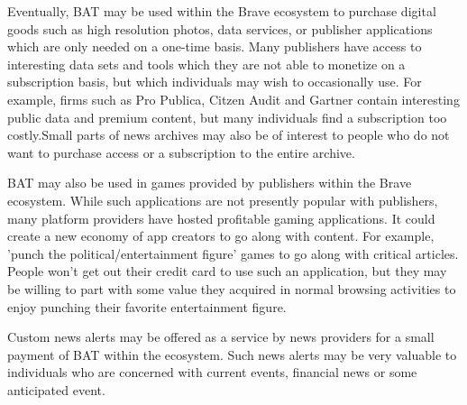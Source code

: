 \documentclass[11pt]{article}
\begin{document}
Eventually, BAT may be used within the Brave ecosystem to purchase digital goods such as high resolution photos, data services, or publisher applications which are only needed on a one-time basis. Many publishers have access to interesting data sets and tools which they are not able to monetize on a subscription basis, but which individuals may wish to occasionally use. For example, firms such as Pro Publica, Citzen Audit and Gartner contain interesting public data and premium content, but many individuals find a subscription too costly.Small parts of news archives may also be of interest to people who do not want to purchase access or a subscription to the entire archive.

BAT may also be used in games provided by publishers within the Brave ecosystem. While such applications are not presently popular with publishers, many platform providers have hosted profitable gaming applications. It could create a new economy of app creators to go along with content. For example, 'punch the political/entertainment figure' games to go along with critical articles. People won't get out their credit card to use such an application, but they may be willing to part with some value they acquired in normal browsing activities to enjoy punching their favorite entertainment figure.

Custom news alerts may be offered as a service by news providers for a small payment of BAT within the ecosystem. Such news alerts may be very valuable to individuals who are concerned with current events, financial news or some anticipated event.
\end{document}
